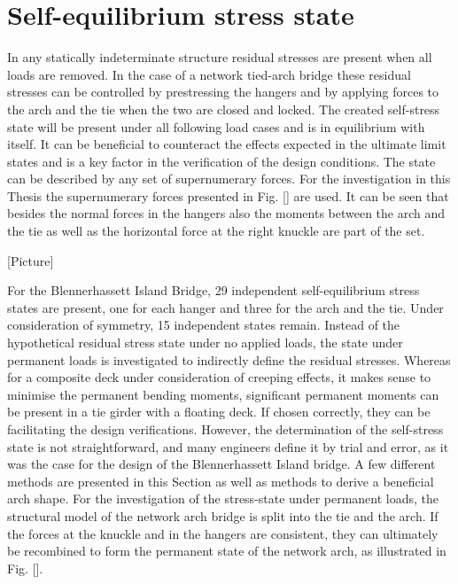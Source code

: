 


\newpage
\section{Self-equilibrium stress state} \label{sec:met_seq}
In any statically indeterminate structure residual stresses are present when all loads are removed. In the case of a network tied-arch bridge these residual stresses can be controlled by prestressing the hangers and by applying forces to the arch and the tie when the two are closed and locked. The created self-stress state will be present under all following load cases and is in equilibrium with itself. It can be beneficial to counteract the effects expected in the ultimate limit states and is a key factor in the verification of the design conditions. The state can be described by any set of supernumerary forces. For the investigation in this Thesis the supernumerary forces presented in Fig. [] are used. It can be seen that besides the normal forces in the hangers also the moments between the arch and the tie as well as the horizontal force at the right knuckle are part of the set.

[Picture]

For the Blennerhassett Island Bridge, 29 independent self-equilibrium stress states are present, one for each hanger and three for the arch and the tie. Under consideration of symmetry, 15 independent states remain. Instead of the hypothetical residual stress state under no applied loads, the state under permanent loads is investigated to indirectly define the residual stresses. Whereas for a composite deck under consideration of creeping effects, it makes sense to minimise the permanent bending moments, significant permanent moments can be present in a tie girder with a floating deck. If chosen correctly, they can be facilitating the design verifications. However, the determination of the self-stress state is not straightforward, and many engineers define it by trial and error, as it was the case for the design of the Blennerhassett Island bridge. A few different methods are presented in this Section as well as methods to derive a beneficial arch shape. For the investigation of the stress-state under permanent loads, the structural model of the network arch bridge is split into the tie and the arch. If the forces at the knuckle and in the hangers are consistent, they can ultimately be recombined to form the permanent state of the network arch, as illustrated in Fig. [].

